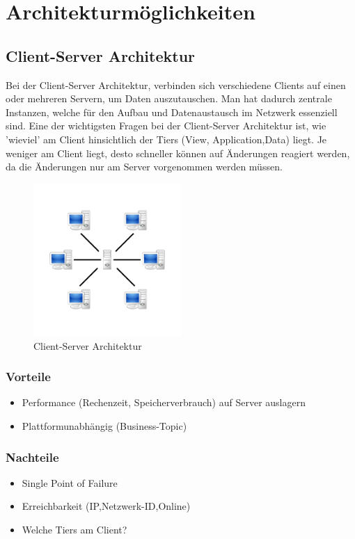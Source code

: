 
\section{Architekturmöglichkeiten}
\subsection{Client-Server Architektur}
Bei der Client-Server Architektur, verbinden sich verschiedene Clients auf einen oder mehreren Servern, um Daten auszutauschen. Man hat dadurch zentrale Instanzen, welche für den Aufbau und Datenaustausch im Netzwerk essenziell sind.
Eine der wichtigsten Fragen bei der Client-Server Architektur ist, wie 'wieviel' am Client hinsichtlich der Tiers (View, Application,Data) liegt. Je weniger am Client liegt, desto schneller können auf Änderungen reagiert werden, da die Änderungen nur am Server vorgenommen werden müssen.
\begin{figure}[htbp] 
	\centering
	\includegraphics[width=0.5\textwidth]{images/client_server.PNG}
	\caption{Client-Server Architektur}
	\label{fig:Bild1}
\end{figure}

\subsubsection{Vorteile}
\begin{itemize}
	\item Performance (Rechenzeit, Speicherverbrauch) auf Server auslagern
	\item Plattformunabhängig (Business-Topic)
\end{itemize}

\subsubsection{Nachteile}
\begin{itemize}
	\item Single Point of Failure
	\item Erreichbarkeit (IP,Netzwerk-ID,Online)
	\item Welche Tiers am Client?
\end{itemize}
